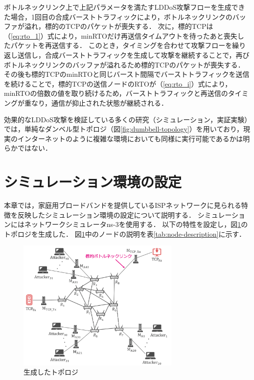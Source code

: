 \documentclass[Japanese]{dicomopapers}
\begin{document}
ボトルネックリンク上で上記パラメータを満たすLDDoS攻撃フローを生成できた場合，1回目の合成バーストトラフィックにより，ボトルネックリンクのバッファが溢れ，標的のTCPのパケットが喪失する．
次に，標的TCPは（\ref{eq:rto_1}）式により，minRTOだけ再送信タイムアウトを待ったあと喪失したパケットを再送信する．
このとき，タイミングを合わせて攻撃フローを繰り返し送信し，合成バーストトラフィックを生成して攻撃を継続することで，再びボトルネックリンクのバッファが溢れるため標的TCPのパケットが喪失する．
その後も標的TCPのminRTOと同じバースト間隔でバーストトラフィックを送信を続けることで，標的TCPの送信ノードのRTOが（\ref{eq:rto_i}）式により，minRTOの倍数の値を取り続けるため，バーストトラフィックと再送信のタイミングが重なり，通信が抑止された状態が継続される．

効果的なLDDoS攻撃を検証している多くの研究（シミュレーション\cite{ldos}\cite{cpr2}\cite{lddos-flow-aggregation}，実証実験\cite{mine-wip-paper}）では，単純なダンベル型トポロジ（図\ref{fig:dumbbell-topology}）を用いており，現実のインターネットのように複雑な環境においても同様に実行可能であるかは明らかではない．

\section{シミュレーション環境の設定}
本章では，家庭用ブロードバンドを提供しているISPネットワークに見られる特徴を反映したシミュレーション環境の設定について説明する．
シミュレーションにはネットワークシミュレータns-3\cite{ns-3}を使用する．
以下の特性を設定し，図\ref{fig:generated-topology}のトポロジを生成した．
図\ref{fig:generated-topology}中のノードの説明を表\ref{tab:node-description}に示す．

\begin{figure}[tb]
    \begin{center}
        \includegraphics[clip,width=8.0cm]{images/generated-topology-big.png}
        \caption{生成したトポロジ}
        \label{fig:generated-topology}
    \end{center}
\end{figure}
\end{document}
